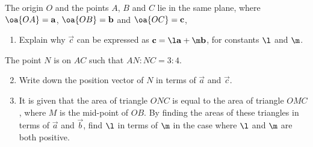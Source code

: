 \documentclass{echw}
\begin{document}

    \problem{}
        \begin{center}
        \end{center}

        The origin $O$ and the points $A$, $B$ and $C$ lie in the same plane, where $\oa{OA} = \vec a$, $\oa{OB} = \vec b$ and $\oa{OC} = \vec c$,

        \begin{enumerate}
            \item Explain why $\vec c$ can be expressed as $\vec c = \l \vec a + \m \vec b$, for constants $\l$ and $\m$.
        \end{enumerate}

         The point $N$ is on $AC$ such that $AN : NC = 3 : 4$.

        \begin{enumerate}
            \setcounter{enumi}{1}
            \item Write down the position vector of $N$ in terms of $\vec a$ and $\vec c$.
            \item It is given that the area of triangle $ONC$ is equal to the area of triangle $OMC$, where $M$ is the mid-point of $OB$. By finding the areas of these triangles in terms of $\vec a$ and $\vec b$, find $\l$ in terms of $\m$ in the case where $\l$ and $\m$ are both positive.
        \end{enumerate}
\end{document}
